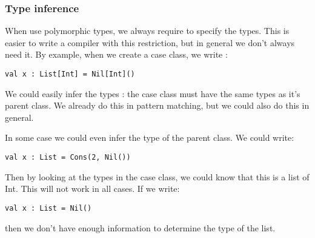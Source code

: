 \subsubsection{Type inference}
When use polymorphic types, we always require to specify the types. This is easier to write a compiler with this restriction, but in general we don't always need it. By example, when we create a case class, we write :
\begin{lstlisting}
val x : List[Int] = Nil[Int]()
\end{lstlisting}
We could easily infer the types : the case class must have the same types as it's parent class. We already do this in pattern matching, but we could also do this in general.

In some case we could even infer the type of the parent class. We could write:
\begin{lstlisting}
val x : List = Cons(2, Nil())
\end{lstlisting}
Then by looking at the types in the case class, we could know that this is a list of Int. This will not work in all cases. If we write: 
\begin{lstlisting}
val x : List = Nil()
\end{lstlisting}
then we don't have enough information to determine the type of the list.
